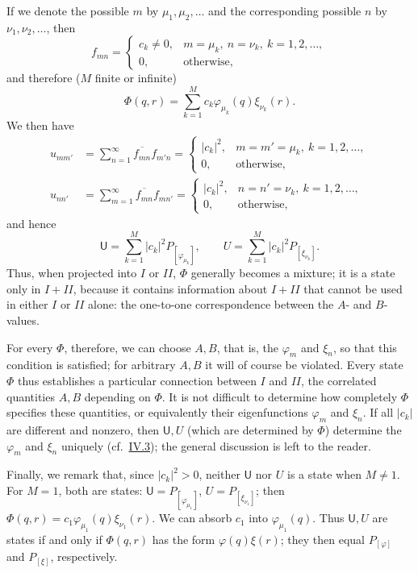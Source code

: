 \documentclass[fontsize=13pt,twoside,openany,headings=normal,parskip=false,bookmarkpackage=false,DIV=calc]{scrbook}
\begin{document}
If we denote the possible $m$ by $\mu_1,\mu_2,\ldots$ and the corresponding possible $n$ by $\nu_1,\nu_2,\ldots$, then
\[
 f_{mn}=\begin{cases}c_k\ne0,&m=\mu_k,\ n=\nu_k,\ k=1,2,\ldots,\\
 0,&\text{otherwise},\end{cases}
\]
and therefore ($M$ finite or infinite)
\[
 \Phi(q,r)=\sum_{k=1}^{M}c_k\varphi_{\mu_k}(q)\xi_{\nu_k}(r).
\]
We then have
\begin{align*}
 u_{mm'}&=\sum_{n=1}^{\infty}\overline{f_{mn}}f_{m'n}
 =\begin{cases}|c_k|^2,&m=m'=\mu_k,\ k=1,2,\ldots,\\0,&\text{otherwise},\end{cases}\\
 u_{nn'}&=\sum_{m=1}^{\infty}\overline{f_{mn}}f_{mn'}
 =\begin{cases}|c_k|^2,&n=n'=\nu_k,\ k=1,2,\ldots,\\0,&\text{otherwise},\end{cases}
\end{align*}
 and hence
\[
 \mathsf U=\sum_{k=1}^{M}|c_k|^2P_{[\varphi_{\mu_k}]},\qquad
 U=\sum_{k=1}^{M}|c_k|^2P_{[\xi_{\nu_k}]}.
\]
Thus, when projected into $I$ or $II$, $\Phi$ generally becomes a mixture; it is a state only in $I+II$, because it contains information about $I+II$ that cannot be used in either $I$ or $II$ alone: the one-to-one correspondence between the $A$- and $B$-values.

For every $\Phi$, therefore, we can choose $A,B$, that is, the $\varphi_m$ and $\xi_n$, so that this condition is satisfied; for arbitrary $A,B$ it will of course be violated. Every state $\Phi$ thus establishes a particular connection between $I$ and $II$, the correlated quantities $A,B$ depending on $\Phi$. It is not difficult to determine how completely $\Phi$ specifies these quantities, or equivalently their eigenfunctions $\varphi_m$ and $\xi_n$. If all $|c_k|$ are different and nonzero, then $\mathsf U,U$ (which are determined by $\Phi$) determine the $\varphi_m$ and $\xi_n$ uniquely (cf.\ \hyperref[sec:IV.3]{IV.3}); the general discussion is left to the reader.

Finally, we remark that, since $|c_k|^2>0$, neither $\mathsf U$ nor $U$ is a state when $M\ne1$. For $M=1$, both are states: $\mathsf U=P_{[\varphi_{\mu_1}]}$, $U=P_{[\xi_{\nu_1}]}$; then $\Phi(q,r)=c_1\varphi_{\mu_1}(q)\xi_{\nu_1}(r)$. We can absorb $c_1$ into $\varphi_{\mu_1}(q)$. Thus $\mathsf U,U$ are states if and only if $\Phi(q,r)$ has the form $\varphi(q)\xi(r)$; they then equal $P_{[\varphi]}$ and $P_{[\xi]}$, respectively.
\end{document}
